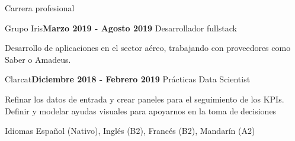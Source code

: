 \documentclass{resume}
\begin{document}
\begin{rSection}{Carrera profesional}
\begin{rSubsection}{Grupo Iris}{\bf \sffamily Marzo 2019 - Agosto 2019 }{Desarrollador fullstack}{}
  \rmfamily
  \item Desarrollo de aplicaciones en el sector aéreo, trabajando con proveedores como Saber o Amadeus.
  \end{rSubsection}

  
\begin{rSubsection}{Clarcat}{\bf \sffamily Diciembre 2018 - Febrero 2019 }{Prácticas Data Scientist}{}
    \rmfamily
    \item Refinar los datos de entrada y crear paneles para el seguimiento de los KPIs.\\
     Definir y modelar ayudas visuales para apoyarnos en la toma de decisiones
    \end{rSubsection}
    


\end{rSection}



\begin{rSection}{Idiomas}{}
  \normalsize
  \rmfamily
  Español (Nativo),
  Inglés (B2), 
  Francés (B2),
  Mandarín (A2)
\end{rSection}
\end{document}
